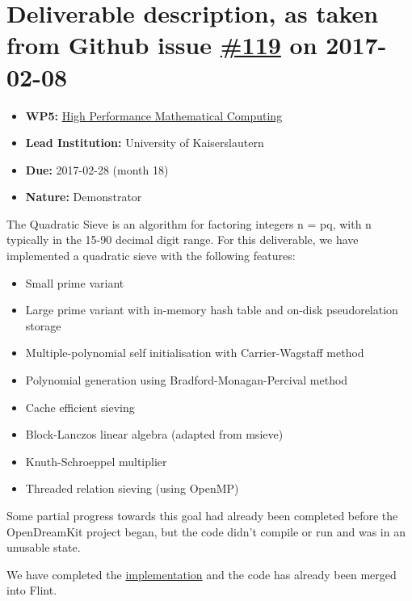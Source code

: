 \section*{\texorpdfstring{Deliverable description, as taken from Github
issue
\href{https://github.com/OpenDreamKit/OpenDreamKit/issues/119}{\#119} on
2017-02-08}{Deliverable description, as taken from Github issue \#119 on 2017-02-08}}\label{deliverable-description-as-taken-from-github-issue-119-on-2017-02-08}

\begin{itemize}
\tightlist
\item
  \textbf{WP5:}
  \href{https://github.com/OpenDreamKit/OpenDreamKit/tree/master/WP5}{High
  Performance Mathematical Computing}
\item
  \textbf{Lead Institution:} University of Kaiserslautern
\item
  \textbf{Due:} 2017-02-28 (month 18)
\item
  \textbf{Nature:} Demonstrator
\end{itemize}

The Quadratic Sieve is an algorithm for factoring integers n = pq, with
n typically in the 15-90 decimal digit range. For this deliverable, we
have implemented a quadratic sieve with the following features:

\begin{itemize}
\tightlist
\item
  Small prime variant
\item
  Large prime variant with in-memory hash table and on-disk
  pseudorelation storage
\item
  Multiple-polynomial self initialisation with Carrier-Wagstaff method
\item
  Polynomial generation using Bradford-Monagan-Percival method
\item
  Cache efficient sieving
\item
  Block-Lanczos linear algebra (adapted from msieve)
\item
  Knuth-Schroeppel multiplier
\item
  Threaded relation sieving (using OpenMP)
\end{itemize}

Some partial progress towards this goal had already been completed
before the OpenDreamKit project began, but the code didn't compile or
run and was in an unusable state.

We have completed the
\href{https://github.com/wbhart/flint2/tree/trunk/qsieve}{implementation}
and the code has already been merged into Flint.

